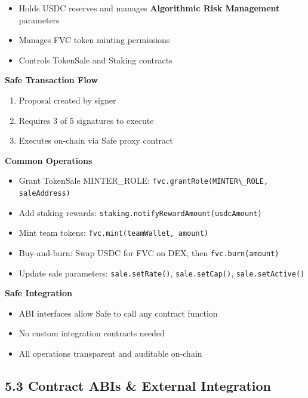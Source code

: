 \documentclass[
  paper=a4,
  ,captions=tableheading
]{scrartcl}
\newcommand{\passthrough}[1]{#1}
\providecommand{\tightlist}{%
  \setlength{\itemsep}{0pt}\setlength{\parskip}{0pt}}
\begin{document}
\begin{itemize}
\tightlist
\item
  Holds USDC reserves and manages \textbf{Algorithmic Risk Management} parameters
\item
  Manages FVC token minting permissions
\item
  Controls TokenSale and Staking contracts
\end{itemize}

\textbf{Safe Transaction Flow}

\begin{enumerate}
\def\labelenumi{\arabic{enumi}.}
\tightlist
\item
  Proposal created by signer
\item
  Requires 3 of 5 signatures to execute
\item
  Executes on-chain via Safe proxy contract
\end{enumerate}

\textbf{Common Operations}

\begin{itemize}
\tightlist
\item
  Grant TokenSale MINTER\_ROLE: \passthrough{\lstinline!fvc.grantRole(MINTER\_ROLE, saleAddress)!}
\item
  Add staking rewards: \passthrough{\lstinline!staking.notifyRewardAmount(usdcAmount)!}
\item
  Mint team tokens: \passthrough{\lstinline!fvc.mint(teamWallet, amount)!}
\item
  Buy-and-burn: Swap USDC for FVC on DEX, then \passthrough{\lstinline!fvc.burn(amount)!}
\item
  Update sale parameters: \passthrough{\lstinline!sale.setRate()!}, \passthrough{\lstinline!sale.setCap()!}, \passthrough{\lstinline!sale.setActive()!}
\end{itemize}

\textbf{Safe Integration}

\begin{itemize}
\tightlist
\item
  ABI interfaces allow Safe to call any contract function
\item
  No custom integration contracts needed
\item
  All operations transparent and auditable on-chain
\end{itemize}

\subsection{5.3 Contract ABIs \& External Integration}\label{contract-abis-external-integration}
\end{document}
